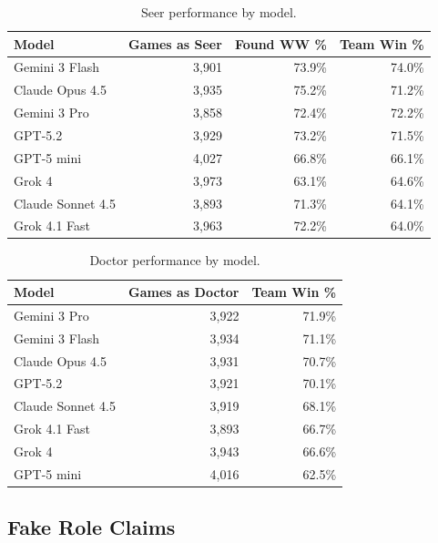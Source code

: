 \begin{table}[ht]
\caption{Seer performance by model.}
\label{tab:seer_perf}
\centering
\small
\begin{tabular}{lrrr}
\toprule
\textbf{Model} & \textbf{Games as Seer} & \textbf{Found WW \%} & \textbf{Team Win \%} \\
\midrule
Gemini 3 Flash          & 3,901 & 73.9\% & 74.0\% \\
Claude Opus 4.5         & 3,935 & 75.2\% & 71.2\% \\
Gemini 3 Pro            & 3,858 & 72.4\% & 72.2\% \\
GPT-5.2                 & 3,929 & 73.2\% & 71.5\% \\
GPT-5 mini              & 4,027 & 66.8\% & 66.1\% \\
Grok 4                  & 3,973 & 63.1\% & 64.6\% \\
Claude Sonnet 4.5       & 3,893 & 71.3\% & 64.1\% \\
Grok 4.1 Fast           & 3,963 & 72.2\% & 64.0\% \\
\bottomrule
\end{tabular}
\end{table}

\begin{table}[ht]
\caption{Doctor performance by model.}
\label{tab:doctor_perf}
\centering
\small
\begin{tabular}{lrr}
\toprule
\textbf{Model} & \textbf{Games as Doctor} & \textbf{Team Win \%} \\
\midrule
Gemini 3 Pro            & 3,922 & 71.9\% \\
Gemini 3 Flash          & 3,934 & 71.1\% \\
Claude Opus 4.5         & 3,931 & 70.7\% \\
GPT-5.2                 & 3,921 & 70.1\% \\
Claude Sonnet 4.5       & 3,919 & 68.1\% \\
Grok 4.1 Fast           & 3,893 & 66.7\% \\
Grok 4                  & 3,943 & 66.6\% \\
GPT-5 mini              & 4,016 & 62.5\% \\
\bottomrule
\end{tabular}
\end{table}


\subsection{Fake Role Claims}
\label{app:fake_claims}

